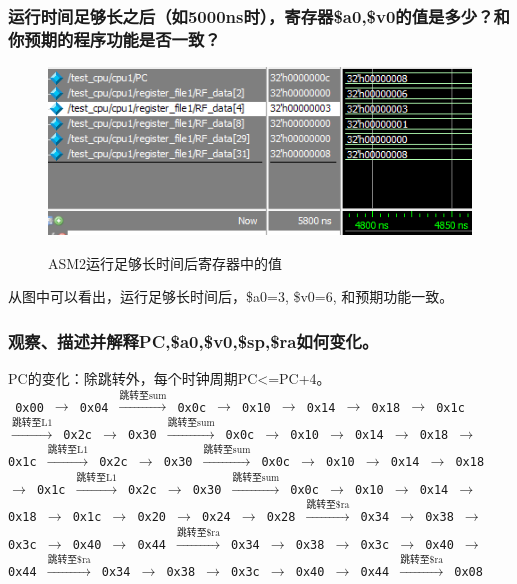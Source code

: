 \documentclass{article}
\begin{document}
            \subsubsection*{运行时间足够长之后（如5000ns时），寄存器\$a0,\$v0的值是多少？和你预期的程序功能是否一致？}
            \begin{figure}[htb]
                \centering
                \includegraphics{fig2.png} \\
                \caption{\label{fig:reg-value-2}ASM2运行足够长时间后寄存器中的值}
            \end{figure}
            从图中可以看出，运行足够长时间后，\$a0=3, \$v0=6, 和预期功能一致。
            \subsubsection*{观察、描述并解释PC,\$a0,\$v0,\$sp,\$ra如何变化。}
            PC的变化：除跳转外，每个时钟周期PC<=PC+4。 \\
            \texttt{
            0x00 $\rightarrow$ 0x04 $\xrightarrow{\text{跳转至sum}}$ 0x0c $\rightarrow$ 0x10  $\rightarrow$ 0x14 $\rightarrow$ 0x18 $\rightarrow$ 0x1c $\xrightarrow{\text{跳转至L1}}$ 0x2c $\rightarrow$ 0x30 $\xrightarrow{\text{跳转至sum}}$ 0x0c $\rightarrow$ 0x10 $\rightarrow$ 0x14 $\rightarrow$ 0x18 $\rightarrow$ 0x1c $\xrightarrow{\text{跳转至L1}}$ 0x2c $\rightarrow$ 0x30 $\xrightarrow{\text{跳转至sum}}$ 0x0c $\rightarrow$ 0x10  $\rightarrow$ 0x14 $\rightarrow$ 0x18 $\rightarrow$ 0x1c $\xrightarrow{\text{跳转至L1}}$ 0x2c $\rightarrow$ 0x30 $\xrightarrow{\text{跳转至sum}}$ 0x0c $\rightarrow$ 0x10 $\rightarrow$ 0x14 $\rightarrow$ 0x18 $\rightarrow$ 0x1c $\rightarrow$ 0x20 $\rightarrow$ 0x24 $\rightarrow$ 0x28 $\xrightarrow{\text{跳转至\$ra}}$ 0x34 $\rightarrow$ 0x38 $\rightarrow$ 0x3c $\rightarrow$ 0x40 $\rightarrow$ 0x44 $\xrightarrow{\text{跳转至\$ra}}$ 0x34 $\rightarrow$ 0x38 $\rightarrow$ 0x3c $\rightarrow$ 0x40 $\rightarrow$ 0x44 $\xrightarrow{\text{跳转至\$ra}}$ 0x34 $\rightarrow$ 0x38 $\rightarrow$ 0x3c $\rightarrow$ 0x40 $\rightarrow$ 0x44 $\xrightarrow{\text{跳转至\$ra}}$ 0x08
            ~\\}
            
\end{document}
